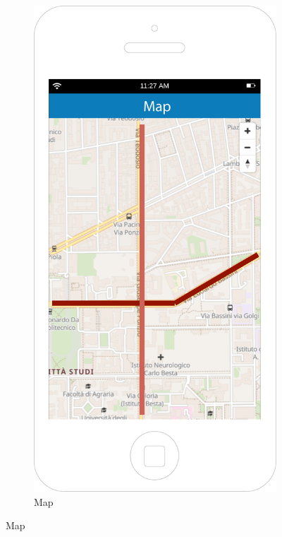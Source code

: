 \documentclass[12pt,a4paper]{report}
\begin{document}
		\begin{figure}
		\begin{subfigure}{0.5\textwidth}
		\setcounter{subfigure}{4}
			\includegraphics[scale=0.25, center]{Map}
			\caption{Map}
			\label{fig:subim2}
		\end{subfigure}

\end{figure}
\end{document}
